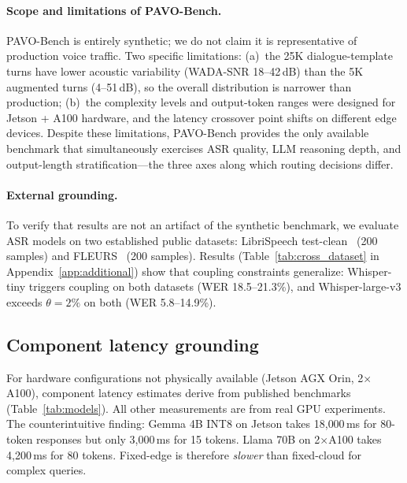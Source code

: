 \documentclass{article}
\begin{document}
\paragraph{Scope and limitations of PAVO-Bench.} PAVO-Bench is entirely synthetic; we do not claim it is representative of production voice traffic. Two specific limitations: (a)~the 25K dialogue-template turns have lower acoustic variability (WADA-SNR 18--42\,dB) than the 5K augmented turns (4--51\,dB), so the overall distribution is narrower than production; (b)~the complexity levels and output-token ranges were designed for Jetson + A100 hardware, and the latency crossover point shifts on different edge devices. Despite these limitations, PAVO-Bench provides the only available benchmark that simultaneously exercises ASR quality, LLM reasoning depth, and output-length stratification---the three axes along which routing decisions differ.

\paragraph{External grounding.} To verify that results are not an artifact of the synthetic benchmark, we evaluate ASR models on two established public datasets: LibriSpeech test-clean~\citep{panayotov2015librispeech} (200 samples) and FLEURS~\citep{conneau2023fleurs} (200 samples). Results (Table~\ref{tab:cross_dataset} in Appendix~\ref{app:additional}) show that coupling constraints generalize: Whisper-tiny triggers coupling on both datasets (WER 18.5--21.3\%), and Whisper-large-v3 exceeds $\theta=2\%$ on both (WER 5.8--14.9\%).

\subsection{Component latency grounding}
\label{sec:latency_ground}

For hardware configurations not physically available (Jetson AGX Orin, 2$\times$A100), component latency estimates derive from published benchmarks (Table~\ref{tab:models}). All other measurements are from real GPU experiments. The counterintuitive finding: Gemma 4B INT8 on Jetson takes 18{,}000\,ms for 80-token responses but only 3{,}000\,ms for 15 tokens. Llama 70B on 2$\times$A100 takes 4{,}200\,ms for 80 tokens. Fixed-edge is therefore \emph{slower} than fixed-cloud for complex queries.
\end{document}
